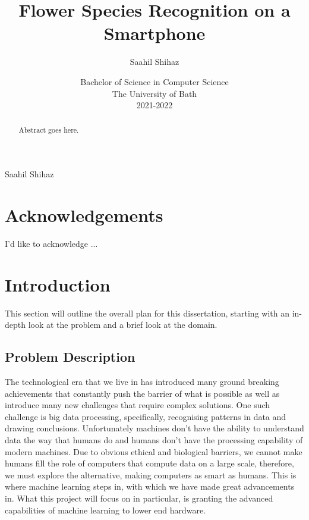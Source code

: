 \documentclass[12pt,a4paper]{report}
\title{\bf Flower Species Recognition on a Smartphone}
\author{Saahil Shihaz}
\date{Bachelor of Science in Computer Science\\
    The University of Bath\\
    2021-2022}
\begin{document}
\hypersetup{pageanchor=false}
\setcounter{page}{0}
\maketitle
\newpage
{}
\newpage
{}
{Saahil Shihaz}
\newpage
\hypersetup{pageanchor=true}
\begin{abstract}

Abstract goes here.

\end{abstract}
\clearpage
\tableofcontents
\clearpage
\listoffigures
\clearpage
\chapter*{Acknowledgements}
\thispagestyle{empty}

I'd like to acknowledge ...

\clearpage
{}
\chapter{Introduction}

This section will outline the overall plan for this dissertation, starting with an in-depth look at the problem and a 
brief look at the domain.

\section{Problem Description}

The technological era that we live in has introduced many ground breaking achievements that constantly push the barrier 
of what is possible as well as introduce many new challenges that require complex solutions. One such challenge is big 
data processing, specifically, recognising patterns in data and drawing conclusions. Unfortunately machines don't have 
the ability to understand data the way that humans do and humans don't have the processing capability of modern 
machines. Due to obvious ethical and biological barriers, we cannot make humans fill the role of computers that compute 
data on a large scale, therefore, we must explore the alternative, making computers as smart as humans. This is where 
machine learning steps in, with which we have made great advancements in. What this project will focus on in particular,
is granting the advanced capabilities of machine learning to lower end hardware.
\end{document}
